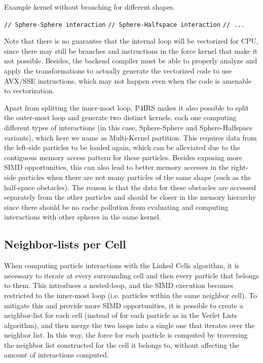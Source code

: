 \documentclass[preprint,12pt]{elsarticle}
\begin{document}
\begin{algorithm}[H]
  \caption{Example kernel without branching for different shapes.}
  \label{alg:no_branching}
  \begin{algorithmic}[1]
        \State \texttt{// Sphere-Sphere interaction}
      \EndFor
        \State \texttt{// Sphere-Halfspace interaction}
      \EndFor
      \State \texttt{// ...}
    \EndFor
  \end{algorithmic}
\end{algorithm}

Note that there is no guarantee that the internal loop will be vectorized for CPU, since there may still be branches and instructions in the force kernel that make it not possible.
Besides, the backend compiler must be able to properly analyze and apply the transformations to actually generate the vectorized code to use AVX/SSE instructions, which may not happen even when the code is amenable to vectorization.

Apart from splitting the inner-most loop, P4IRS makes it also possible to split the outer-most loop and generate two distinct kernels, each one computing different types of interactions (in this case, Sphere-Sphere and Sphere-Halfspace variants), which here we name as Multi-Kernel partition.
This requires data from the left-side particles to be loaded again, which can be alleviated due to the contiguous memory access pattern for these particles.
Besides exposing more SIMD opportunities, this can also lead to better memory accesses in the right-side particles when there are not many particles of the same shape (such as the half-space obstacles).
The reason is that the data for these obstacles are accessed separately from the other particles and should be closer in the memory hierarchy since there should be no cache pollution from evaluating and computing interactions with other spheres in the same kernel.

\subsection{Neighbor-lists per Cell}
\label{sec:neighbor_lists_per_cell}

When computing particle interactions with the Linked Cells algorithm, it is necessary to iterate at every surrounding cell and then every particle that belongs to them.
This introduces a nested-loop, and the SIMD execution becomes restricted to the inner-most loop (i.e. particles within the same neighbor cell).
To mitigate this and provide more SIMD opportunities, it is possible to create a neighbor-list for each cell (instead of for each particle as in the Verlet Lists algorithm), and then merge the two loops into a single one that iterates over the neighbor list.
In this way, the force for each particle is computed by traversing the neighbor list constructed for the cell it belongs to, without affecting the amount of interactions computed.
\end{document}
